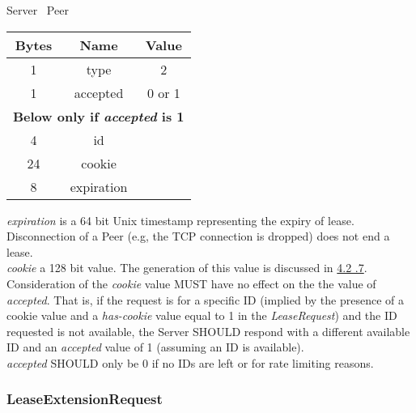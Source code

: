 \documentclass{article}
\begin{document}
    \begin{center}
        Server \textrightarrow\ Peer\\
        \begin{tabular}{|c|c|c|}
            \hline
            \textbf{Bytes} & \textbf{Name} & \textbf{Value} \\
            \hline
            1              & type          & 2              \\
            \hline
            1              & accepted      & 0 or 1         \\
            \hline
            \multicolumn{3}{|c|}{\textbf{Below only if \emph{accepted} is 1} } \\
            \hline
            4              & id            &                \\
            \hline
            24             & cookie        &                \\
            \hline
            8              & expiration    &                \\
            \hline
        \end{tabular}
    \end{center}

    \emph{expiration} is a 64 bit Unix timestamp representing the expiry of lease. Disconnection of a Peer (e.g,
    the TCP connection is dropped) does not end a lease.\\

    \emph{cookie} a 128 bit value. The generation of this value is discussed in \hyperlink{subsubsection.4.2.7}{4.2
    .7}.\\

    Consideration of the \emph{cookie} value MUST have no effect on the the value of \emph{accepted}. That is, if the
    request is for a specific ID (implied by the presence of a cookie value and a \emph{has-cookie} value equal to 1
    in the \emph{LeaseRequest}) and the ID requested is not available, the Server SHOULD respond with a different
    available ID and an \emph{accepted} value of 1 (assuming an ID is available).\\

    \emph{accepted} SHOULD only be 0 if no IDs are left or for rate limiting reasons.

    \subsubsection{LeaseExtensionRequest}
\end{document}

